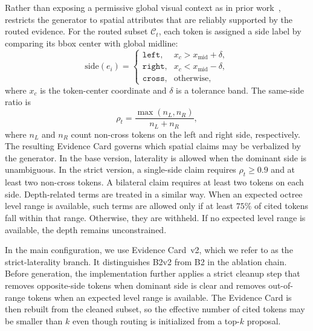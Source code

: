 Rather than exposing a permissive global visual context as in prior work~\cite{hamamci2024ct2rep,chen2025reg2rg}, \method{} restricts the generator to spatial attributes that are reliably supported by the routed evidence. For the routed subset $\mathcal{C}_t$, each token is assigned a side label by comparing its bbox center with global midline:
\begin{equation}
\mathrm{side}(e_i)=
\begin{cases}
\texttt{left}, & x_c > x_{\mathrm{mid}}+\delta,\\
\texttt{right}, & x_c < x_{\mathrm{mid}}-\delta,\\
\texttt{cross}, & \text{otherwise},
\end{cases}
\label{eq:side_new}
\end{equation}
where $x_c$ is the token-center coordinate and $\delta$ is a tolerance band. The same-side ratio is
\begin{equation}
\rho_t = \frac{\max(n_L,n_R)}{n_L+n_R},
\label{eq:ssr_new}
\end{equation}
where $n_L$ and $n_R$ count non-cross tokens on the left and right side, respectively. The resulting Evidence Card governs which spatial claims may be verbalized by the generator. In the base version, laterality is allowed when the dominant side is unambiguous. In the strict version, a single-side claim requires $\rho_t \geq 0.9$ and at least two non-cross tokens. A bilateral claim requires at least two tokens on each side. Depth-related terms are treated in a similar way. When an expected octree level range is available, such terms are allowed only if at least $75\%$ of cited tokens fall within that range. Otherwise, they are withheld. If no expected level range is available, the depth remains unconstrained.

In the main configuration, we use Evidence Card~v2, which we refer to as the strict-laterality branch. It distinguishes B2\textquotesingle v2 from B2\textquotesingle{} in the ablation chain. Before generation, the implementation further applies a strict cleanup step that removes opposite-side tokens when dominant side is clear and removes out-of-range tokens when an expected level range is available. The Evidence Card is then rebuilt from the cleaned subset, so the effective number of cited tokens may be smaller than $k$ even though routing is initialized from a top-$k$ proposal.

